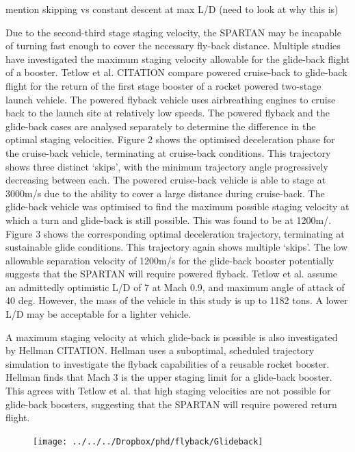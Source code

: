 mention skipping vs constant descent at max L/D (need to look at why this is)


Due to the second-third stage staging velocity, the SPARTAN may be incapable of turning fast enough to cover the necessary fly-back distance. Multiple studies have investigated the maximum staging velocity allowable for the glide-back flight of a booster. 
Tetlow et al. CITATION compare powered cruise-back to glide-back flight for the return of the first stage booster of a rocket powered two-stage launch vehicle. The powered flyback vehicle uses airbreathing engines to cruise back to the launch site at relatively low speeds. The powered flyback and the glide-back cases are analysed separately to determine the difference in the optimal staging velocities. Figure 2 shows the optimised deceleration phase for the cruise-back vehicle, terminating at cruise-back conditions. This trajectory shows three distinct ‘skips’, with the minimum trajectory angle progressively decreasing between each. The powered cruise-back vehicle is able to stage at 3000m/s due to the ability to cover a large distance during cruise-back. 
The glide-back vehicle was optimised to find the maximum possible staging velocity at which a turn and glide-back is still possible. This was found to be at 1200m/. Figure 3 shows the corresponding optimal deceleration trajectory, terminating at sustainable glide conditions. This trajectory again shows multiple ‘skips’. The low allowable separation velocity of 1200m/s for the glide-back booster potentially suggests that the SPARTAN will require powered flyback. 
Tetlow et al. assume an admittedly optimistic L/D of 7 at Mach 0.9, and maximum angle of attack of 40 deg. However, the mass of the vehicle in this study is up to 1182 tons. A lower L/D may be acceptable for a lighter vehicle.  

A maximum staging velocity at which glide-back is possible is also investigated by Hellman CITATION. Hellman uses a suboptimal, scheduled trajectory simulation to investigate the flyback capabilities of a reusable rocket booster. Hellman finds that Mach 3 is the upper staging limit for a glide-back booster. This agrees with Tetlow et al. that high staging velocities are not possible for glide-back boosters, suggesting that the SPARTAN will require powered return flight.

\begin{figure}
\centering
\texttt{[image: ../../../Dropbox/phd/flyback/Glideback]}
\caption{}
\label{fig:Glideback}
\end{figure}

